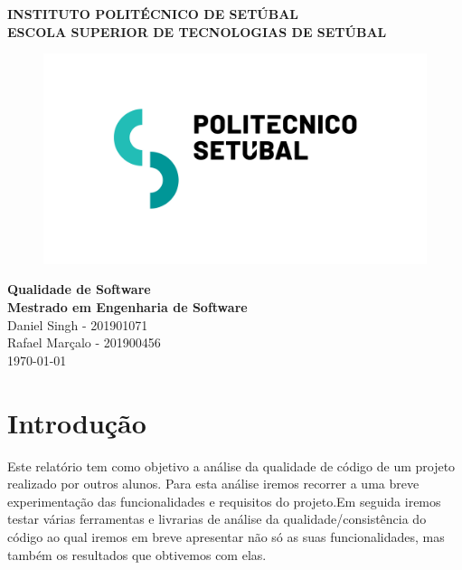 \documentclass[a4paper,12pt]{article} %
\begin{document}
\begin{titlepage}
	\centering
	\Large \textbf{INSTITUTO POLITÉCNICO DE SETÚBAL} \\
	\normalsize \textbf{ESCOLA SUPERIOR DE TECNOLOGIAS DE SETÚBAL} \\
	\vspace{2cm}
	\begin{figure}[ht!]
		\centering
		\includegraphics[scale=.5]{images/IPSLogo.png}
	\end{figure}
	\vspace{1cm}
	\Large \textbf{Qualidade de Software}\\
	\Large \textbf{Mestrado em Engenharia de Software}\\
	\vspace{1.5 cm}
	\Large Daniel Singh - 201901071\\
	\Large Rafael Marçalo - 201900456\\
	\vspace{.5cm}
	\large \today
\end{titlepage}

\newpage
\tableofcontents

\newpage
\listoffigures

\newpage
\listoftables

\newpage
\section{Introdução}
Este relatório tem como objetivo a análise da qualidade de código de um projeto realizado por outros alunos. Para esta análise iremos recorrer a uma breve experimentação das funcionalidades e requisitos do projeto.Em seguida iremos testar várias ferramentas e livrarias de análise da qualidade/consistência do código ao qual iremos em breve apresentar não só as suas funcionalidades, mas também os resultados que obtivemos com elas.
\end{document}
